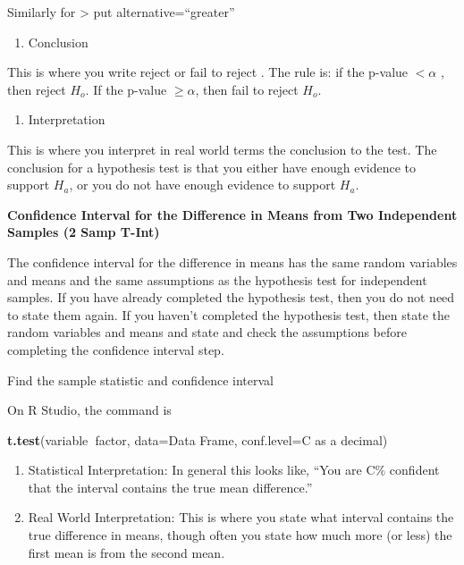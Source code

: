 \documentclass[
]{book}
\newenvironment{Shaded}{\begin{snugshade}}{\end{snugshade}}
\newcommand{\DataTypeTok}[1]{\textcolor[rgb]{0.13,0.29,0.53}{#1}}
\newcommand{\KeywordTok}[1]{\textcolor[rgb]{0.13,0.29,0.53}{\textbf{#1}}}
\newcommand{\NormalTok}[1]{#1}
\newcommand{\OperatorTok}[1]{\textcolor[rgb]{0.81,0.36,0.00}{\textbf{#1}}}
\providecommand{\tightlist}{%
  \setlength{\itemsep}{0pt}\setlength{\parskip}{0pt}}
\begin{document}
Similarly for \textgreater{} put alternative=``greater''

\begin{enumerate}
\def\labelenumi{\arabic{enumi}.}
\setcounter{enumi}{4}
\tightlist
\item
  Conclusion
\end{enumerate}

This is where you write reject or fail to reject . The rule is: if the p-value \(<\alpha\) , then reject \(H_o\). If the p-value \(\ge \alpha\), then fail to reject \(H_o\).

\begin{enumerate}
\def\labelenumi{\arabic{enumi}.}
\setcounter{enumi}{5}
\tightlist
\item
  Interpretation
\end{enumerate}

This is where you interpret in real world terms the conclusion to the test. The conclusion for a hypothesis test is that you either have enough evidence to support \(H_a\), or you do not have enough evidence to support \(H_a\).

\textbf{Confidence Interval for the Difference in Means from Two Independent Samples (2 Samp T-Int)}

The confidence interval for the difference in means has the same random variables and means and the same assumptions as the hypothesis test for independent samples. If you have already completed the hypothesis test, then you do not need to state them again. If you haven't completed the hypothesis test, then state the random variables and means and state and check the assumptions before completing the confidence interval step.

Find the sample statistic and confidence interval

On R Studio, the command is

\begin{Shaded}
\begin{Highlighting}[]
\KeywordTok{t.test}\NormalTok{(variable}\OperatorTok{~}\NormalTok{factor, }\DataTypeTok{data=}\NormalTok{Data Frame, }\DataTypeTok{conf.level=}\NormalTok{C as a decimal)}
\end{Highlighting}
\end{Shaded}

\begin{enumerate}
\def\labelenumi{\arabic{enumi}.}
\setcounter{enumi}{1}
\item
  Statistical Interpretation: In general this looks like, ``You are C\% confident that the interval contains the true mean difference.''
\item
  Real World Interpretation: This is where you state what interval contains the true difference in means, though often you state how much more (or less) the first mean is from the second mean.
\end{enumerate}
\end{document}
